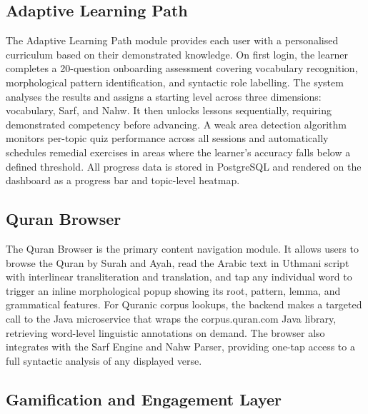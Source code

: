 \documentclass[A4paper,12pt]{article}
\begin{document}


\subsection{Adaptive Learning Path}

The Adaptive Learning Path module provides each user with a personalised curriculum based on
their demonstrated knowledge. On first login, the learner completes a 20-question onboarding
assessment covering vocabulary recognition, morphological pattern identification, and syntactic
role labelling. The system analyses the results and assigns a starting level across three
dimensions: vocabulary, Sarf, and Nahw. It then unlocks lessons sequentially, requiring
demonstrated competency before advancing. A weak area detection algorithm monitors per-topic
quiz performance across all sessions and automatically schedules remedial exercises in areas
where the learner's accuracy falls below a defined threshold. All progress data is stored in
PostgreSQL and rendered on the dashboard as a progress bar and topic-level heatmap.

\subsection{Quran Browser}

The Quran Browser is the primary content navigation module. It allows users to browse the
Quran by Surah and Ayah, read the Arabic text in Uthmani script with interlinear
transliteration and translation, and tap any individual word to trigger an inline morphological
popup showing its root, pattern, lemma, and grammatical features. For Quranic corpus lookups,
the backend makes a targeted call to the Java microservice that wraps the corpus.quran.com
Java library, retrieving word-level linguistic annotations on demand. The browser also
integrates with the Sarf Engine and Nahw Parser, providing one-tap access to a full syntactic
analysis of any displayed verse.

\subsection{Gamification and Engagement Layer}
\end{document}

